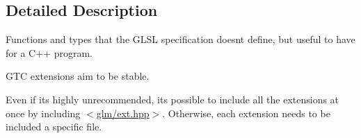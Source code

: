 \subsection{Detailed Description}
Functions and types that the G\+L\+SL specification doesn\textquotesingle{}t define, but useful to have for a C++ program. 

G\+TC extensions aim to be stable.

Even if it\textquotesingle{}s highly unrecommended, it\textquotesingle{}s possible to include all the extensions at once by including $<$\hyperlink{ext_8hpp}{glm/ext.\+hpp}$>$. Otherwise, each extension needs to be included a specific file. 